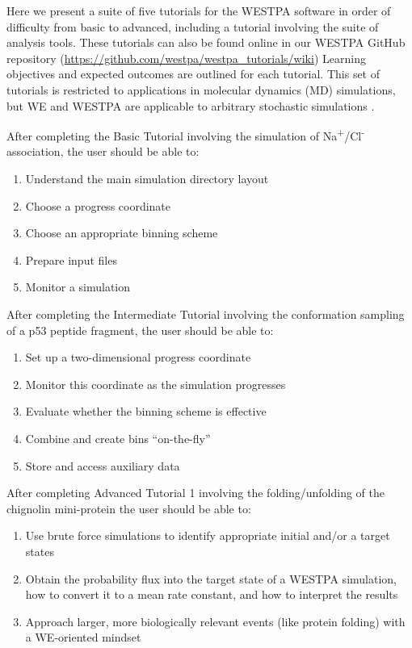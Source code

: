 \documentclass[9pt,tutorial,ASAPversion]{livecoms}
\begin{document}
Here we present a suite of five tutorials for the WESTPA software in order of difficulty from basic to advanced, including a tutorial involving the suite of analysis tools. These tutorials can also be found online in our WESTPA GitHub repository (\url{https://github.com/westpa/westpa_tutorials/wiki})
Learning objectives and expected outcomes are outlined for each tutorial. 
This set of tutorials is restricted to applications in molecular dynamics (MD) simulations, but WE and WESTPA are applicable to arbitrary stochastic simulations \citep{Donovan2013,Donovan2016,Read2018}.

After completing the Basic Tutorial involving the simulation of Na\textsuperscript{+}/Cl\textsuperscript{-} association, the user should be able to: 
\begin{enumerate}
\item Understand the main simulation directory layout
\item Choose a progress coordinate
\item Choose an appropriate binning scheme
\item Prepare input files
\item Monitor a simulation
\end{enumerate}

After completing the Intermediate Tutorial involving the conformation sampling of a p53 peptide fragment, the user should be able to:
\begin{enumerate}
\item Set up a two-dimensional progress coordinate
\item Monitor this coordinate as the simulation progresses
\item Evaluate whether the binning scheme is effective
\item Combine and create bins “on-the-fly”
\item Store and access auxiliary data
\end{enumerate}

After completing Advanced Tutorial 1 involving the folding/unfolding of the chignolin mini-protein the user should be able to:
\begin{enumerate}
\item Use brute force simulations to identify appropriate initial and/or a target states
\item Obtain the probability flux into the target state of a WESTPA simulation, how to convert it to a mean rate constant, and how to interpret the results
\item Approach larger, more biologically relevant events (like protein folding) with a WE-oriented mindset
\end{enumerate}
\end{document}
